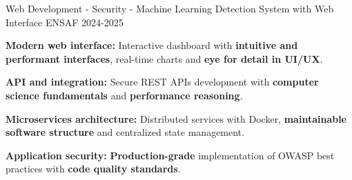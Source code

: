 
\begin{cventries}

    \cventry
    {Web Development - Security - Machine Learning}
    {Detection System with Web Interface} %
    {ENSAF} %
    {2024-2025} %
    {
        \begin{cvitems} %
            \item {
                        \textbf{Modern web interface:}
                        Interactive dashboard with \textbf{intuitive and performant interfaces}, real-time charts and \textbf{eye for detail in UI/UX}.}
            \item {
                        \textbf{API and integration:}
                        Secure REST APIs development with \textbf{computer science fundamentals} and \textbf{performance reasoning}.}
            \item {
                        \textbf{Microservices architecture:}
                        Distributed services with Docker, \textbf{maintainable software structure} and centralized state management.}
            \item {
                        \textbf{Application security:}
                        \textbf{Production-grade} implementation of OWASP best practices with \textbf{code quality standards}.}
        \end{cvitems}
    }

\end{cventries}